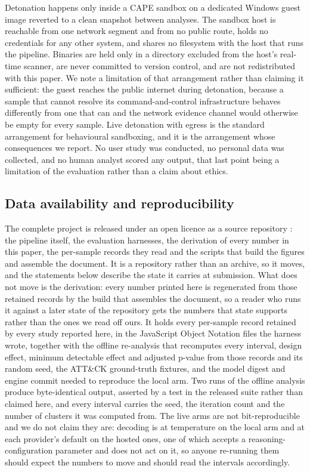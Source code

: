 Detonation happens only inside a CAPE sandbox on a dedicated Windows guest image reverted to a clean
snapshot between analyses. The sandbox host is reachable from one network segment and from no public
route, holds no credentials for any other system, and shares no filesystem with the host that runs
the pipeline. Binaries are held only in a directory excluded from the host's real-time scanner, are
never committed to version control, and are not redistributed with this paper. We note a limitation
of that arrangement rather than claiming it sufficient: the guest reaches the public internet during
detonation, because a sample that cannot resolve its command-and-control infrastructure behaves
differently from one that can and the network evidence channel would otherwise be empty for every
sample. Live detonation with egress is the standard arrangement for behavioural sandboxing, and it
is the arrangement whose consequences we report. No user study was conducted, no personal data was
collected, and no human analyst scored any output, that last point being a limitation of the
evaluation rather than a claim about ethics.

\subsection*{Data availability and reproducibility}\label{data-availability}

The complete project is released under an open licence as a source repository
\citep{release2026artefact}: the pipeline itself, the
evaluation harnesses, the derivation of every number in this paper, the per-sample records they read
and the scripts that build the figures and assemble the document. It is a repository rather than an
archive, so it moves, and the statements below describe the state it carries at submission. What
does not move is the derivation: every number printed here is regenerated from those retained
records by the build that assembles the document, so a reader who runs it against a later state of
the repository gets the numbers that state supports rather than the ones we read off ours.
It holds every per-sample record retained by every study reported here, in the JavaScript
Object Notation files the
harness wrote, together with the offline re-analysis that recomputes every interval, design effect,
minimum detectable effect and adjusted p-value from those records and its random seed, the ATT\&CK
ground-truth fixtures, and the model digest and engine commit needed to reproduce the local arm.
Two runs of the offline analysis produce byte-identical output, asserted by a test
in the released suite rather than claimed here, and every interval carries the seed, the iteration
count and the number of clusters it was computed from. The live arms are not bit-reproducible and we
do not claim they are: decoding is at temperature  on the local arm and at
each provider's default on the hosted ones, one of which accepts a reasoning-configuration parameter
and does not act on it, so anyone re-running them should expect the numbers to move and should read
the intervals accordingly.

